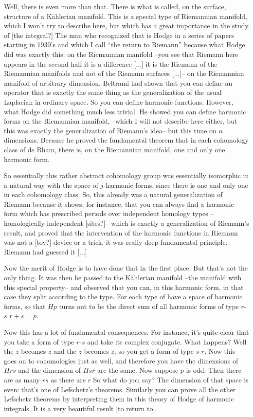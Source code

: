 \documentclass{article}
\begin{document}
Well, there is even more than that.
There is what is called, on the surface, structure of a K\"ahlerian manifold.
This is a special type of Riemannian manifold, which I won't try to describe here,
but which has a great importance in the study of [the integral?]
The man who recognized that is Hodge in a series of papers starting in 1930's
and which I call ``the return to Riemann''
because what Hodge did was exactly this:
on the Riemannian manifold --you see that Riemann here appears in the second half
it is a difference [...] it is the Riemann of the Riemannian manifolds and not of the Riemann surfaces [...]--
on the Riemannian manifold of arbitrary dimension,
Beltrami had shown that you can define an operator
that is exactly the same thing 
as the generalization of the usual Laplacian in ordinary space.
So you can define harmonic functions.
However, what Hodge did something much less trivial.
He showed you can define harmonic forms on the Riemannian manifold,
--which I will not describe here either,
but this was exactly the generalization of Riemann's idea--
but this time on $n$ dimensions.
Because he proved the fundamental theorem
that in each cohomology class of de Rham, 
there is, on the Riemannian manifold, one and only one harmonic form.

So essentially this rather abstract cohomology group was essentially
isomorphic in a natural way with the space of $j$-harmonic forms,
since there is one and only one in each cohomology class.
So, this already was a natural generalization of Riemann
because it shows, for instance,
that you can always find a harmonic form which has prescribed periods
over independent homology types 
--homologically independent [sites?]--
which is exactly a generalization of Riemann's result,
and proved that the intervention of the harmonic functions in Riemann
was not a [toy?] device or a trick,
it was really deep fundamental principle.
Riemann had guessed it [...]

Now the merit of Hodge is to have done that in the first place.
But that's not the only thing.
It was then he passed to the K\"ahlerian manifold
--the manifold with this special property--
and observed that you can,
in this harmonic form,
in that case they split according to the type.
For each type of have a space of harmonic forms,
so that $Hp$ turns out to be the direct sum of all harmonic forms of type $r$-$s$
$r+s=p$.

Now this has a lot of fundamental consequences.
For instance, it's quite clear that you take a form of type $r$-$s$
and take its complex conjugate.
What happens?
Well the $\bar{z}$ becomes $z$ and the $z$ becomes $\bar{z}$,
so you get a form of type $s$-$r$.
Now this goes on to cohomologies just as well,
and therefore you have the dimensions of $Hrs$ and the dimension of $Hsr$ are the same.
Now suppose $p$ is odd.
Then there are as many $rs$ as there are $r$
So what do you say?
The dimension of that space is even:
that's one of Lefschetz's theorems.
Similarly you can prove all the other Lefschetz theorems
by interpreting them in this theory of Hodge of harmonic integrals.
It is a very beautiful result [to return to].
\end{document}
